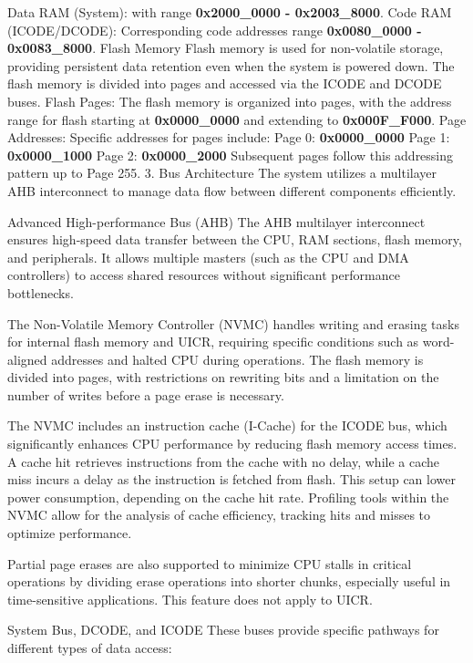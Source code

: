 \documentclass{Configuration_Files/PoliMi3i_thesis}
\begin{document}
Data RAM (System): with range \textbf{0x2000\_0000 - 0x2003\_8000}.
Code RAM (ICODE/DCODE): Corresponding code addresses range \textbf{0x0080\_0000 - 0x0083\_8000}.
Flash Memory
Flash memory is used for non-volatile storage, providing persistent data retention even when the system is powered down. The flash memory is divided into pages and accessed via the ICODE and DCODE buses.
Flash Pages: The flash memory is organized into pages, with the address range for flash starting at \textbf{0x0000\_0000} and extending to \textbf{0x000F\_F000}.
Page Addresses: Specific addresses for pages include:
Page 0: \textbf{0x0000\_0000}
Page 1: \textbf{0x0000\_1000}
Page 2: \textbf{0x0000\_2000}
Subsequent pages follow this addressing pattern up to Page 255.
3. Bus Architecture
The system utilizes a multilayer AHB interconnect to manage data flow between different components efficiently.

Advanced High-performance Bus (AHB)
The AHB multilayer interconnect ensures high-speed data transfer between the CPU, RAM sections, flash memory, and peripherals. It allows multiple masters (such as the CPU and DMA controllers) to access shared resources without significant performance bottlenecks.

The Non-Volatile Memory Controller (NVMC) handles writing and erasing tasks for internal flash memory and UICR, requiring specific conditions such as word-aligned addresses and halted CPU during operations. The flash memory is divided into pages, with restrictions on rewriting bits and a limitation on the number of writes before a page erase is necessary.

The NVMC includes an instruction cache (I-Cache) for the ICODE bus, which significantly enhances CPU performance by reducing flash memory access times. A cache hit retrieves instructions from the cache with no delay, while a cache miss incurs a delay as the instruction is fetched from flash. This setup can lower power consumption, depending on the cache hit rate. Profiling tools within the NVMC allow for the analysis of cache efficiency, tracking hits and misses to optimize performance.

Partial page erases are also supported to minimize CPU stalls in critical operations by dividing erase operations into shorter chunks, especially useful in time-sensitive applications. This feature does not apply to UICR.

System Bus, DCODE, and ICODE
These buses provide specific pathways for different types of data access:
\end{document}
